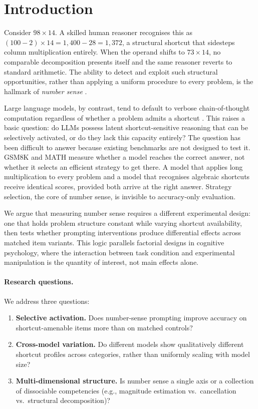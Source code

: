 \section{Introduction}
\label{sec:introduction}

Consider $98 \times 14$.
A skilled human reasoner recognises this as $(100 - 2) \times 14 = 1{,}400 - 28 = 1{,}372$, a structural shortcut that sidesteps column multiplication entirely.
When the operand shifts to $73 \times 14$, no comparable decomposition presents itself and the same reasoner reverts to standard arithmetic.
The ability to detect and exploit such structural opportunities, rather than applying a uniform procedure to every problem, is the hallmark of \emph{number sense} \citep{mcintosh1992proposed, reys1991number}.

Large language models, by contrast, tend to default to verbose chain-of-thought computation regardless of whether a problem admits a shortcut \citep{wei2022chain, kojima2022large}.
This raises a basic question: do LLMs possess latent shortcut-sensitive reasoning that can be selectively activated, or do they lack this capacity entirely?
The question has been difficult to answer because existing benchmarks are not designed to test it.
GSM8K \citep{cobbe2021gsm8k} and MATH \citep{hendrycks2021math} measure whether a model reaches the correct answer, not whether it selects an efficient strategy to get there.
A model that applies long multiplication to every problem and a model that recognises algebraic shortcuts receive identical scores, provided both arrive at the right answer.
Strategy selection, the core of number sense, is invisible to accuracy-only evaluation.

We argue that measuring number sense requires a different experimental design: one that holds problem structure constant while varying shortcut availability, then tests whether prompting interventions produce differential effects across matched item variants.
This logic parallels factorial designs in cognitive psychology, where the interaction between task condition and experimental manipulation is the quantity of interest, not main effects alone.

\paragraph{Research questions.}
We address three questions:
\begin{enumerate}[leftmargin=*,itemsep=2pt]
    \item \textbf{Selective activation.} Does number-sense prompting improve accuracy on shortcut-amenable items more than on matched controls?
    \item \textbf{Cross-model variation.} Do different models show qualitatively different shortcut profiles across categories, rather than uniformly scaling with model size?
    \item \textbf{Multi-dimensional structure.} Is number sense a single axis or a collection of dissociable competencies (e.g., magnitude estimation vs.\ cancellation vs.\ structural decomposition)?
\end{enumerate}

